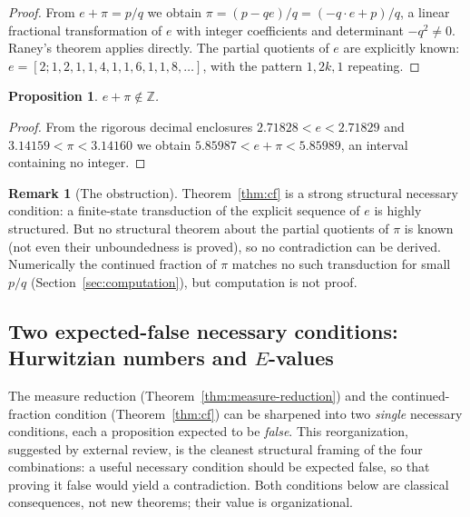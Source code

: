 \documentclass[11pt]{amsart}
\newtheorem{proposition}[theorem]{Proposition}
\theoremstyle{definition}
\newtheorem{remark}[theorem]{Remark}
\theoremstyle{remark}
\numberwithin{equation}{section}
\newcommand{\Z}{\mathbb{Z}}
\newcommand{\ee}{e}
\begin{document}
\begin{proof}
From $e+\pi=p/q$ we obtain $\pi=(p-qe)/q=(-q\cdot e+p)/q$, a linear fractional transformation of $e$ with integer coefficients and determinant $-q^2\ne0$. Raney's theorem applies directly. The partial quotients of $\ee$ are explicitly known: $\ee=[2;1,2,1,1,4,1,1,6,1,1,8,\dots]$, with the pattern $1,2k,1$ repeating.
\end{proof}

\begin{proposition}\label{prop:not-integer}
$e+\pi\notin\Z$.
\end{proposition}

\begin{proof}
From the rigorous decimal enclosures $2.71828<e<2.71829$ and $3.14159<\pi<3.14160$ we obtain $5.85987<e+\pi<5.85989$, an interval containing no integer.
\end{proof}

\begin{remark}[The obstruction]
Theorem~\ref{thm:cf} is a strong structural necessary condition: a finite-state transduction of the explicit sequence of $\ee$ is highly structured. But no structural theorem about the partial quotients of $\pi$ is known (not even their unboundedness is proved), so no contradiction can be derived. Numerically the continued fraction of $\pi$ matches no such transduction for small $p/q$ (Section~\ref{sec:computation}), but computation is not proof.
\end{remark}

\subsection{Two expected-false necessary conditions: Hurwitzian numbers and \texorpdfstring{$E$}{E}-values}\label{sec:expected-false}

The measure reduction (Theorem~\ref{thm:measure-reduction}) and the continued-fraction condition (Theorem~\ref{thm:cf}) can be sharpened into two \emph{single} necessary conditions, each a proposition expected to be \emph{false}. This reorganization, suggested by external review, is the cleanest structural framing of the four combinations: a useful necessary condition should be expected false, so that proving it false would yield a contradiction. Both conditions below are classical consequences, not new theorems; their value is organizational.
\end{document}
